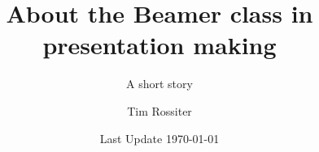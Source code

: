 \documentclass[aspectratio=169]{beamer} %
\title[Beamer Template] %
{About the Beamer class in presentation making}
\subtitle{A short story}
\author{Tim Rossiter}
\institute[RCET]
{
  Collage of Technology \\
  Idaho State University
  }
\date[Section 1] %
{Last Update \today}
\begin{document}
  \frame{\titlepage}
\end{document}

